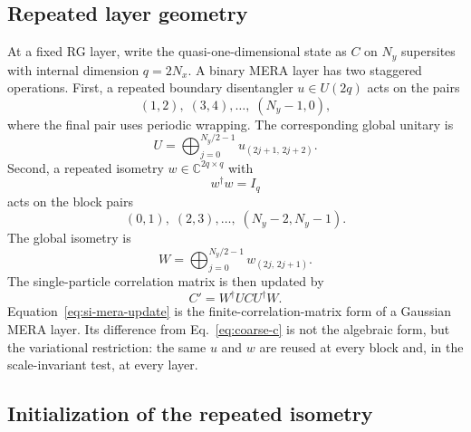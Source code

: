\documentclass[aps,prb,twocolumn,floatfix]{revtex4-2}
\begin{document}
\subsection{Repeated layer geometry}

At a fixed RG layer, write the quasi-one-dimensional state as \(C\) on
\(N_y\) supersites with internal dimension \(q=2N_x\).  A binary MERA layer has
two staggered operations.  First, a repeated boundary disentangler
\(u\in U(2q)\) acts on the pairs
\begin{equation}
  (1,2),\;(3,4),\ldots,\;(N_y-1,0),
  \label{eq:boundary-pairs}
\end{equation}
where the final pair uses periodic wrapping.  The corresponding global unitary
is
\begin{equation}
  U = \bigoplus_{j=0}^{N_y/2-1} u_{(2j+1,\,2j+2)}.
  \label{eq:global-disentangler}
\end{equation}
Second, a repeated isometry \(w\in\mathbb{C}^{2q\times q}\) with
\begin{equation}
  w^\dagger w=I_q
  \label{eq:w-isometry}
\end{equation}
acts on the block pairs
\begin{equation}
  (0,1),\;(2,3),\ldots,\;(N_y-2,N_y-1).
  \label{eq:block-pairs}
\end{equation}
The global isometry is
\begin{equation}
  W = \bigoplus_{j=0}^{N_y/2-1} w_{(2j,\,2j+1)}.
  \label{eq:global-repeated-isometry}
\end{equation}
The single-particle correlation matrix is then updated by
\begin{equation}
  C' = W^\dagger U C U^\dagger W.
  \label{eq:si-mera-update}
\end{equation}
Equation~\eqref{eq:si-mera-update} is the finite-correlation-matrix form of a
Gaussian MERA layer.  Its difference from Eq.~\eqref{eq:coarse-c} is not the
algebraic form, but the variational restriction: the same \(u\) and \(w\) are
reused at every block and, in the scale-invariant test, at every layer.

\subsection{Initialization of the repeated isometry}
\end{document}

